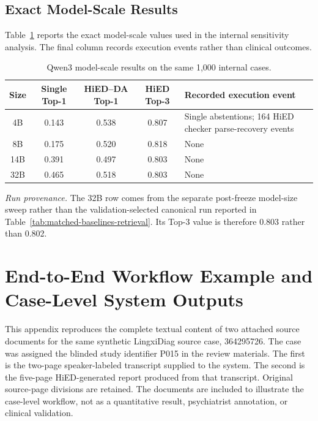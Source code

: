 \documentclass[12pt,a4paper,oneside]{report}
\begin{document}
\section{Exact Model-Scale Results}

Table~\ref{tab:qwen-size-results} reports the exact model-scale values used in the internal sensitivity analysis. The final column records execution events rather than clinical outcomes.

\begin{table}[H]
\centering
\caption{Qwen3 model-scale results on the same 1,000 internal cases.}
\label{tab:qwen-size-results}
\small
\renewcommand{\arraystretch}{1.10}
\begin{tabularx}{\textwidth}{|c|c|c|c|>{\raggedright\arraybackslash}X|}
\hline
Size & Single Top-1 & HiED--DA Top-1 & HiED Top-3 & Recorded execution event\\
\hline
4B & 0.143 & 0.538 & 0.807 & 17 Single abstentions; 164 HiED checker parse-recovery events\\
\hline
8B & 0.175 & 0.520 & 0.818 & None\\
\hline
14B & 0.391 & 0.497 & 0.803 & None\\
\hline
32B & 0.465 & 0.518 & 0.803 & None\\
\hline
\end{tabularx}
\renewcommand{\arraystretch}{1.0}
\end{table}

\noindent\textit{Run provenance.} The 32B row comes from the separate
post-freeze model-size sweep rather than the validation-selected canonical
run reported in Table~\ref{tab:matched-baselines-retrieval}. Its Top-3
value is therefore 0.803 rather than 0.802.

\chapter{End-to-End Workflow Example and Case-Level System Outputs}
\label{app:workflow-example}

This appendix reproduces the complete textual content of two attached
source documents for the same synthetic LingxiDiag source case,
364295726. The case was assigned the blinded study identifier P015 in the
review materials. The first is the two-page speaker-labeled transcript
supplied to the system. The
second is the five-page HiED-generated report produced from that
transcript. Original source-page divisions are retained. The documents
are included to illustrate the case-level workflow, not as a quantitative
result, psychiatrist annotation, or clinical validation.
\end{document}
